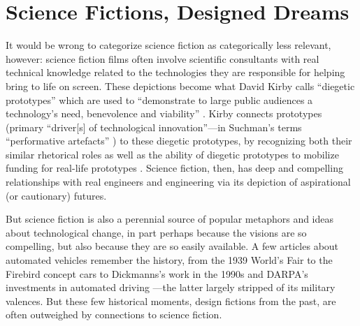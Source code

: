 \section{Science Fictions, Designed Dreams}

It would be wrong to categorize science
fiction as categorically less relevant, however: science fiction
films
often involve scientific consultants with real
technical knowledge related to the technologies they are responsible for
helping bring to life on screen. These depictions become what David
Kirby calls ``diegetic prototypes'' which are used to ``demonstrate to
large public audiences a technology's need, benevolence and
viability'' \cite[p. 43]{kirbyFuture}. Kirby connects prototypes (primary
``driver[s] of technological innovation''---in
Suchman's terms ``performative artefacts'' \cite[p. 45]{kirbyFuture})
to these diegetic prototypes, 
by recognizing both their similar rhetorical roles as well as the
ability of diegetic prototypes to mobilize funding for real-life
prototypes \cite[p. 44-47]{kirbyFuture}. Science fiction, then, has deep
and compelling relationships with real engineers and engineering via
its depiction of aspirational (or cautionary) futures.


But science fiction is also a perennial source of popular metaphors and ideas
about technological change, in part perhaps because the visions are so
compelling, but also because they are so easily available. A few
articles about automated vehicles remember the history, from the 1939
World's Fair \cite{CBSPetersen} to the Firebird concept cars
\cite{walshVs} to Dickmanns's work in the 
1990s \cite{HCRIDriverless} and DARPA's investments in automated
driving \cite{economistSR}---the latter largely stripped of its
 military valences. But these few historical moments, design fictions
 from the past, are often outweighed by connections to science fiction.

